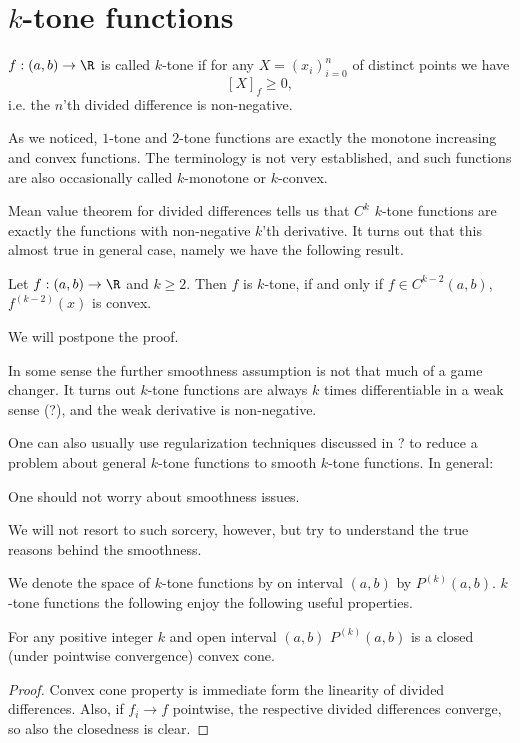 \section{$k$-tone functions}

\begin{maar}
	$f : (a, b) \to \R$ is called $k$-tone if for any $X = (x_{i})_{i = 0}^{n}$ of distinct points we have
	\[
		[X]_{f} \geq 0,
	\]
	i.e. the $n$'th divided difference is non-negative.
\end{maar}

As we noticed, $1$-tone and $2$-tone functions are exactly the monotone increasing and convex functions. The terminology is not very established, and such functions are also occasionally called $k$-monotone or $k$-convex.

Mean value theorem for divided differences tells us that $C^{k}$ $k$-tone functions are exactly the functions with non-negative $k$'th derivative. It turns out that this almost true in general case, namely we have the following result.

\begin{lause}\label{k-tone_smooth}
	Let $f : (a, b) \to \R$ and $k \geq 2$. Then $f$ is $k$-tone, if and only if $f \in C^{k - 2}(a, b)$, $f^{(k - 2)}(x)$ is convex.
\end{lause}

We will postpone the proof.

In some sense the further smoothness assumption is not that much of a game changer. It turns out $k$-tone functions are always $k$ times differentiable in a weak sense (?), and the weak derivative is non-negative.

One can also usually use regularization techniques discussed in ? to reduce a problem about general $k$-tone functions to smooth $k$-tone functions. In general:

\begin{phil}
	One should not worry about smoothness issues.
\end{phil}

We will not resort to such sorcery, however, but try to understand the true reasons behind the smoothness.

We denote the space of $k$-tone functions by on interval $(a, b)$ by $P^{(k)}(a, b)$. $k$-tone functions the following enjoy the following useful properties.

\begin{prop}
	For any positive integer $k$ and open interval $(a, b)$ $P^{(k)}(a, b)$ is a closed (under pointwise convergence) convex cone.
\end{prop}
\begin{proof}
	Convex cone property is immediate form the linearity of divided differences. Also, if $f_{i} \to f$ pointwise, the respective divided differences converge, so also the closedness is clear.
\end{proof}

